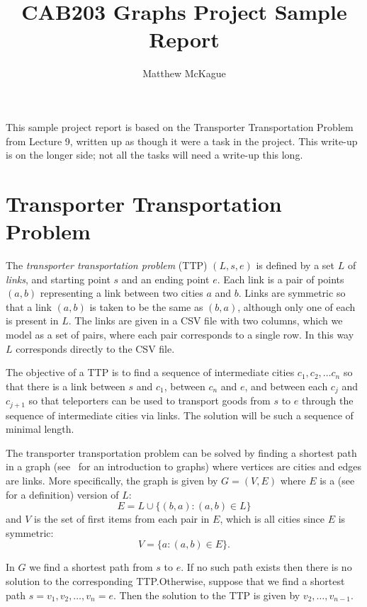 \documentclass[a4paper]{article}
\author{Matthew McKague}
\title{CAB203 Graphs Project Sample Report}
\date{}
\begin{document}
\maketitle

This sample project report is based on the Transporter Transportation Problem from Lecture 9, written up as though it were a task in the project.  This write-up is on the longer side; not all the tasks will need a write-up this long.

\section{Transporter Transportation Problem}

The \emph{transporter transportation problem} (TTP) $(L, s, e)$ is defined by a set $L$ of \emph{links}, and starting point $s$ and an ending point $e$.  Each link is a pair of points $(a,b)$ representing a link between two cities $a$ and $b$.  Links are symmetric so that a link $(a,b)$ is taken to be the same as $(b, a)$, although only one of each is present in $L$.  The links are given in a CSV file with two columns, which we model as a set of pairs, where each pair corresponds to a single row.  In this way $L$ corresponds directly to the CSV file.

The objective of a TTP is to find a sequence of intermediate cities $c_1, c_2, \ldots c_n$ so that there is a link between $s$ and $c_1$, between $c_n$ and $e$, and between each $c_j$ and $c_{j+1}$ so that teleporters can be used to transport goods from $s$ to $e$ through the sequence of intermediate cities via links.  The solution will be such a sequence of minimal length.

The transporter transportation problem can be solved by finding a shortest path in a graph (see~\cite{voloshintextbook} for an introduction to graphs) where vertices are cities and edges are links.  More specifically, the graph is given by $G = (V, E)$ where $E$ is a  (see~\cite{cab203lecture6} for a definition) version of $L$:
\begin{equation}\label{eq:E}
    E = L \cup \{ (b, a) : (a,b) \in L \}
\end{equation}
and $V$ is the set of first items from each pair in $E$, which is all cities since $E$ is symmetric:
\begin{equation}\label{eq:V}
    V = \{ a : (a,b) \in E\}.
\end{equation}

In $G$ we find a shortest path from $s$ to $e$.  If no such path exists then there is no solution to the corresponding TTP.\@  Otherwise, suppose that we find a shortest path $s = v_1, v_2, \ldots , v_n= e$.  Then the solution to the TTP is given by $v_2, \ldots, v_{n-1}$.
\end{document}
